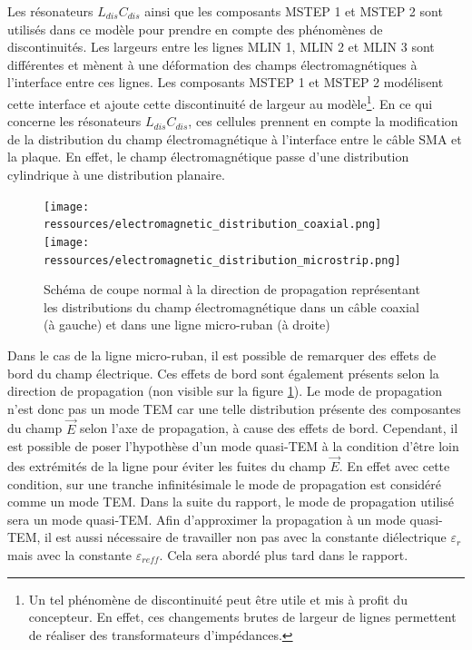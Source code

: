 \documentclass[french]{article}
\begin{document}
Les résonateurs $L_{dis}C_{dis}$ ainsi que les composants MSTEP 1 et MSTEP 2 sont utilisés dans ce modèle pour prendre en compte des phénomènes de discontinuités. Les largeurs entre les lignes MLIN 1, MLIN 2 et MLIN 3 sont différentes et mènent à une déformation des champs électromagnétiques à l'interface entre ces lignes. Les composants MSTEP 1 et MSTEP 2 modélisent cette interface et ajoute cette discontinuité de largeur au modèle\footnote{Un tel phénomène de discontinuité peut être utile et mis à profit du concepteur. En effet, ces changements brutes de largeur de lignes permettent de réaliser des transformateurs d'impédances.}. En ce qui concerne les résonateurs $L_{dis}C_{dis}$, ces cellules prennent en compte la modification de la distribution du champ électromagnétique à l'interface entre le câble SMA et la plaque. En effet, le champ électromagnétique passe d'une distribution cylindrique à une distribution planaire.


\begin{figure}[H]
	\centering
	\texttt{[image: ressources/electromagnetic\_distribution\_coaxial.png]}
	\texttt{[image: ressources/electromagnetic\_distribution\_microstrip.png]}
	\caption{Schéma de coupe normal à la direction de propagation représentant les distributions du champ électromagnétique dans un câble coaxial (à gauche) et dans une ligne micro-ruban (à droite)}
	\label{fig:schema_distribution_EOM}
\end{figure}

\newpage

Dans le cas de la ligne micro-ruban, il est possible de remarquer des effets de bord du champ électrique. Ces effets de bord sont également présents selon la direction de propagation (non visible sur la figure \ref{fig:schema_distribution_EOM}). Le mode de propagation n'est donc pas un mode TEM car une telle distribution présente des composantes du champ $\overrightarrow{E}$ selon l'axe de propagation, à cause des effets de bord. Cependant, il est possible de poser l'hypothèse d'un mode quasi-TEM à la condition d'être loin des extrémités de la ligne pour éviter les fuites du champ $\overrightarrow{E}$. En effet avec cette condition, sur une tranche infinitésimale le mode de propagation est considéré comme un mode TEM. Dans la suite du rapport, le mode de propagation utilisé sera un mode quasi-TEM. Afin d'approximer la propagation à un mode quasi-TEM, il est aussi nécessaire de travailler non pas avec la constante diélectrique $\varepsilon_r$ mais avec la constante $\varepsilon_{reff}$. Cela sera abordé plus tard dans le rapport.
\end{document}
